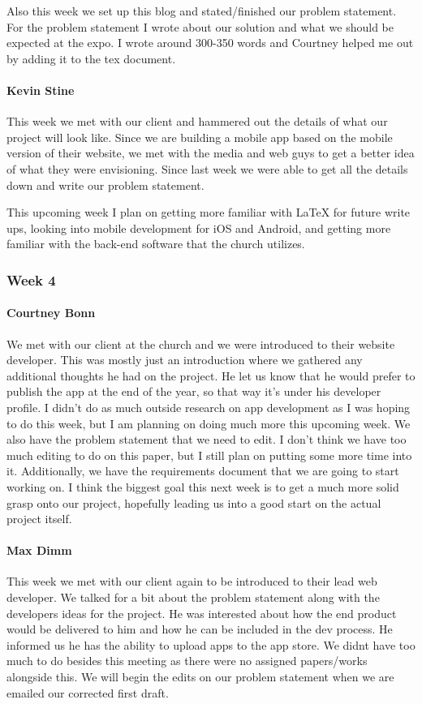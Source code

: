 \documentclass[letterpaper,10pt,draftclsnofoot,onecolumn,titlepage]{IEEEtran}
\begin{document}
Also this week we set up this blog and stated/finished our problem statement. For the problem statement I wrote about our solution and what we should be expected at the expo. I wrote around 300-350 words and Courtney helped me out by adding it to the tex document.
			
			\paragraph{Kevin Stine}
			This week we met with our client and hammered out the details of what our project will look like. Since we are building a mobile app based on the mobile version of their website, we met with the media and web guys to get a better idea of what they were envisioning. Since last week we were able to get all the details down and write our problem statement.

This upcoming week I plan on getting more familiar with LaTeX for future write ups, looking into mobile development for iOS and Android, and getting more familiar with the back-end software that the church utilizes.

		\subsubsection{Week 4}
		
			\paragraph{Courtney Bonn}
			We met with our client at the church and we were introduced to their website developer. This was mostly just an introduction where we gathered any additional thoughts he had on the project. He let us know that he would prefer to publish the app at the end of the year, so that way it's under his developer profile. I didn't do as much outside research on app development as I was hoping to do this week, but I am planning on doing much more this upcoming week. We also have the problem statement that we need to edit. I don't think we have too much editing to do on this paper, but I still plan on putting some more time into it. Additionally, we have the requirements document that we are going to start working on. I think the biggest goal this next week is to get a much more solid grasp onto our project, hopefully leading us into a good start on the actual project itself.

			\paragraph{Max Dimm}
			This week we met with our client again to be introduced to their lead web developer. We talked for a bit about the problem statement along with the developers ideas for the project. He was interested about how the end product would be delivered to him and how he can be included in the dev process. He informed us he has the ability to upload apps to the app store. We didnt have too much to do besides this meeting as there were no assigned papers/works alongside this. We will begin the edits on our problem statement when we are emailed our corrected first draft.
			
\end{document}

